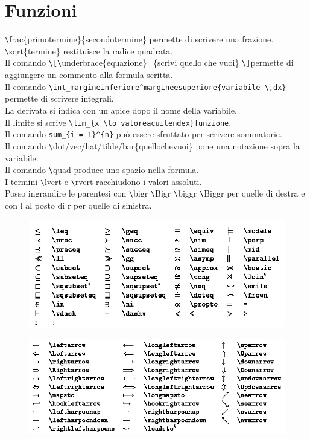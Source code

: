 \section{Funzioni}
\verb|\|frac\{primotermine\}\{secondotermine\} permette di scrivere una frazione.\\
\verb|\|sqrt\{termine\} restituisce la radice quadrata.\\
Il comando \verb|\[\|underbrace\{equazione\}\_\{scrivi quello che vuoi\} \verb|\]|permette di aggiungere un commento alla formula scritta.\\
Il comando \verb|\|\verb|int_margineinferiore^margineesuperiore{variabile \,dx}| \\permette di scrivere integrali.\\
La derivata si indica con un apice dopo il nome della variabile.\\
Il limite si scrive \verb|\lim_{x \to valoreacuitendex}funzione|.\\
Il comando \verb|sum_{i = 1}^{n}| può essere sfruttato per scrivere sommatorie.\\
Il comando \verb|\|dot/vec/hat/tilde/bar\{quellochevuoi\} pone una notazione sopra la variabile.\\
Il comando \verb|\|quad produce uno spazio nella formula.\\
I termini \verb|\|lvert e \verb|\|rvert racchiudono i valori assoluti.\\
Posso ingrandire le parentesi con \verb|\|bigr \verb|\|Bigr \verb|\|biggr \verb|\|Biggr per quelle di destra e con l al posto di r per quelle di sinistra.\\

\begin{figure}[H]
\centering
\includegraphics[scale=0.6]{t3}
\end{figure}

\begin{figure}[H]
\centering
\includegraphics[scale=0.6]{t5}
\end{figure}

